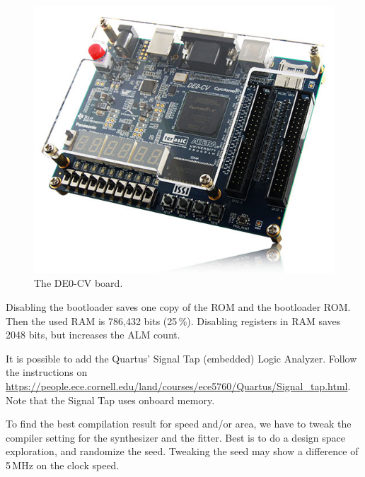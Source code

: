 \documentclass[12pt]{article}
\begin{document}
\begin{figure}[!ht]
\centering
\includegraphics[scale=0.45]{images/image-de0-cv}
\caption{The DE0-CV board.}
\label{fig:image-de0-cv}
\end{figure}

Disabling the bootloader saves one copy of the ROM and the bootloader ROM. Then the used RAM is 786,432 bits (25\,\%). Disabling registers in RAM saves 2048 bits, but increases the ALM count.

It is possible to add the Quartus' Signal Tap (embedded) Logic Analyzer. Follow the instructions on \url{https://people.ece.cornell.edu/land/courses/ece5760/Quartus/Signal_tap.html}. Note that the Signal Tap uses onboard memory.

To find the best compilation result for speed and/or area, we have to tweak the compiler setting for the synthesizer and the fitter. Best is to do a design space exploration, and randomize the seed. Tweaking the seed may show a difference of 5\,MHz on the clock speed.
\end{document}
